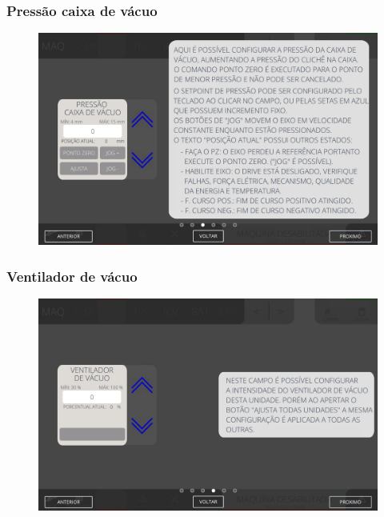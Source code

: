 \newpage
\thispagestyle{fancy}
\vspace*{\fill}
\subsubsection{\small{Pressão caixa de vácuo}} \label{sec:telaConfiguracoesImpressoraPressaoCaixaVaco}
\vspace*{\fill}
\begin{figure}[h]
    \centering
    \includegraphics[width=576 px,height=360 px]{src/imagesICV/04-printters/02-printter/settings/e-3.png}
\end{figure}
\vspace*{\fill}

\newpage
\thispagestyle{fancy}
\vspace*{\fill}
\subsubsection{\small{Ventilador de vácuo}} \label{sec:telaConfiguracoesImpressoraVentiladorVaco}
\vspace*{\fill}
\begin{figure}[h]
    \centering
    \includegraphics[width=576 px,height=360 px]{src/imagesICV/04-printters/02-printter/settings/e-4.png}
\end{figure}
\vspace*{\fill}

